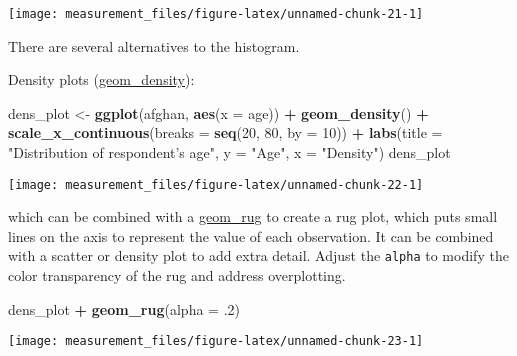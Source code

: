 \documentclass[]{book}
\newenvironment{Shaded}{\begin{snugshade}}{\end{snugshade}}
\newcommand{\DataTypeTok}[1]{\textcolor[rgb]{0.13,0.29,0.53}{#1}}
\newcommand{\DecValTok}[1]{\textcolor[rgb]{0.00,0.00,0.81}{#1}}
\newcommand{\FloatTok}[1]{\textcolor[rgb]{0.00,0.00,0.81}{#1}}
\newcommand{\KeywordTok}[1]{\textcolor[rgb]{0.13,0.29,0.53}{\textbf{#1}}}
\newcommand{\NormalTok}[1]{#1}
\newcommand{\OperatorTok}[1]{\textcolor[rgb]{0.81,0.36,0.00}{\textbf{#1}}}
\newcommand{\StringTok}[1]{\textcolor[rgb]{0.31,0.60,0.02}{#1}}
\theoremstyle{definition}
\theoremstyle{definition}
\theoremstyle{definition}
\theoremstyle{remark}
\begin{document}
\begin{center}\texttt{[image: measurement\_files/figure-latex/unnamed-chunk-21-1]} \end{center}

There are several alternatives to the histogram.

Density plots
(\href{https://www.rdocumentation.org/packages/ggplot2/topics/geom_density}{geom\_density}):

\begin{Shaded}
\begin{Highlighting}[]
\NormalTok{dens_plot <-}\StringTok{ }\KeywordTok{ggplot}\NormalTok{(afghan, }\KeywordTok{aes}\NormalTok{(}\DataTypeTok{x =}\NormalTok{ age)) }\OperatorTok{+}
\StringTok{  }\KeywordTok{geom_density}\NormalTok{() }\OperatorTok{+}
\StringTok{  }\KeywordTok{scale_x_continuous}\NormalTok{(}\DataTypeTok{breaks =} \KeywordTok{seq}\NormalTok{(}\DecValTok{20}\NormalTok{, }\DecValTok{80}\NormalTok{, }\DataTypeTok{by =} \DecValTok{10}\NormalTok{)) }\OperatorTok{+}
\StringTok{  }\KeywordTok{labs}\NormalTok{(}\DataTypeTok{title =} \StringTok{"Distribution of respondent's age"}\NormalTok{,}
       \DataTypeTok{y =} \StringTok{"Age"}\NormalTok{, }\DataTypeTok{x =} \StringTok{"Density"}\NormalTok{)}
\NormalTok{dens_plot}
\end{Highlighting}
\end{Shaded}

\begin{center}\texttt{[image: measurement\_files/figure-latex/unnamed-chunk-22-1]} \end{center}

which can be combined with a
\href{https://www.rdocumentation.org/packages/ggplot2/topics/geom_rug}{geom\_rug}
to create a rug plot, which puts small lines on the axis to represent
the value of each observation. It can be combined with a scatter or
density plot to add extra detail. Adjust the \texttt{alpha} to modify
the color transparency of the rug and address overplotting.

\begin{Shaded}
\begin{Highlighting}[]
\NormalTok{dens_plot }\OperatorTok{+}\StringTok{ }\KeywordTok{geom_rug}\NormalTok{(}\DataTypeTok{alpha =} \FloatTok{.2}\NormalTok{)}
\end{Highlighting}
\end{Shaded}

\begin{center}\texttt{[image: measurement\_files/figure-latex/unnamed-chunk-23-1]} \end{center}
\end{document}
